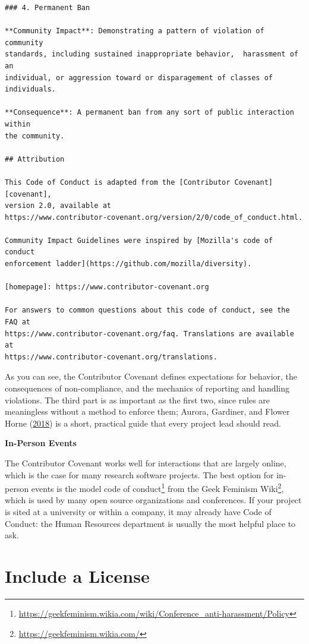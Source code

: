 \documentclass[
]{krantz}
\renewenvironment{quote}{\begin{VF}}{\end{VF}}
\renewcommand{\href}[2]{#2\footnote{\url{#1}}}
\begin{document}
\begin{verbatim}
### 4. Permanent Ban

**Community Impact**: Demonstrating a pattern of violation of community
standards, including sustained inappropriate behavior,  harassment of an
individual, or aggression toward or disparagement of classes of individuals.

**Consequence**: A permanent ban from any sort of public interaction within
the community.

## Attribution

This Code of Conduct is adapted from the [Contributor Covenant][covenant],
version 2.0, available at
https://www.contributor-covenant.org/version/2/0/code_of_conduct.html.

Community Impact Guidelines were inspired by [Mozilla's code of conduct
enforcement ladder](https://github.com/mozilla/diversity).

[homepage]: https://www.contributor-covenant.org

For answers to common questions about this code of conduct, see the FAQ at
https://www.contributor-covenant.org/faq. Translations are available at
https://www.contributor-covenant.org/translations.
\end{verbatim}

As you can see,
the Contributor Covenant defines expectations for behavior,
the consequences of non-compliance,
and the mechanics of reporting and handling violations.
The third part is as important as the first two,
since rules are meaningless without a method to enforce them;
Aurora, Gardiner, and Flower Horne (\protect\hyperlink{ref-Auro2018}{2018}) is a short, practical guide that every project lead should read.

\begin{quote}
\textbf{In-Person Events}

The Contributor Covenant works well for interactions that are largely online,
which is the case for many research software projects.
The best option for in-person events is
the \href{https://geekfeminism.wikia.com/wiki/Conference_anti-harassment/Policy}{model code of conduct} from the \href{https://geekfeminism.wikia.com/}{Geek Feminism Wiki},
which is used by many open source organizations and conferences.
If your project is sited at a university or within a company,
it may already have Code of Conduct:
the Human Resources department is usually the most helpful place to ask.
\end{quote}

\hypertarget{teams-license}{%
\section{Include a License}\label{teams-license}}
\end{document}
